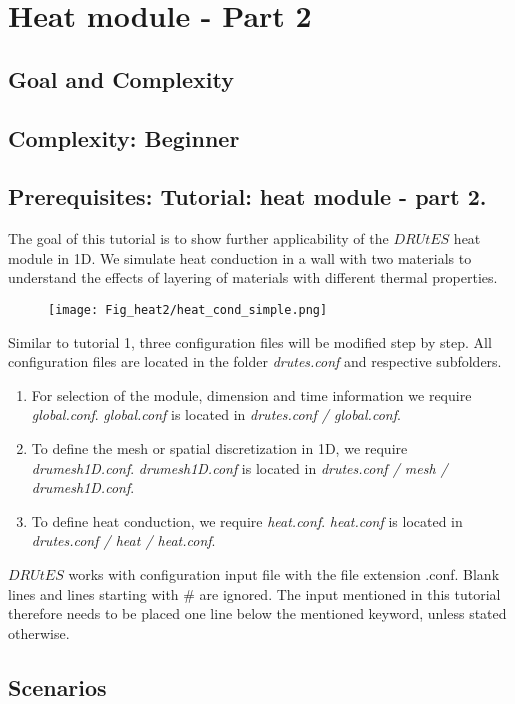\section{Heat module - Part 2}
\subsection{Goal and Complexity}
\subsection*{Complexity: Beginner}

\subsection*{Prerequisites: Tutorial: heat module - part 2.}

The goal of this tutorial is to show further applicability of the $DRUtES$ heat module in 1D. We simulate heat conduction in a wall with two materials to understand the effects of layering of materials with different thermal properties.\medskip

\begin{figure}[!h]
\centering
\texttt{[image: Fig\_heat2/heat\_cond\_simple.png]}
\end{figure}

Similar to tutorial 1, three configuration files will be modified step by step. All configuration files are located in the folder \emph{drutes.conf} and respective subfolders. \begin{enumerate}
\item For selection of the module, dimension and time information we require \emph{global.conf}.  \emph{global.conf} is located in \emph{drutes.conf / global.conf}. 
\item To define the mesh or spatial discretization in 1D,  we require \emph{drumesh1D.conf}. \emph{drumesh1D.conf} is located in \emph{drutes.conf / mesh / drumesh1D.conf}. 
\item To define heat conduction, we require \emph{heat.conf}. \emph{heat.conf} is located in \emph{drutes.conf / heat / heat.conf}. 
\end{enumerate}
$DRUtES$ works with configuration input file with the file extension .conf. Blank lines and lines starting with \# are ignored. The input mentioned in this tutorial therefore needs to be placed one line below the mentioned keyword, unless stated otherwise. 

\newpage
\subsection{Scenarios}

